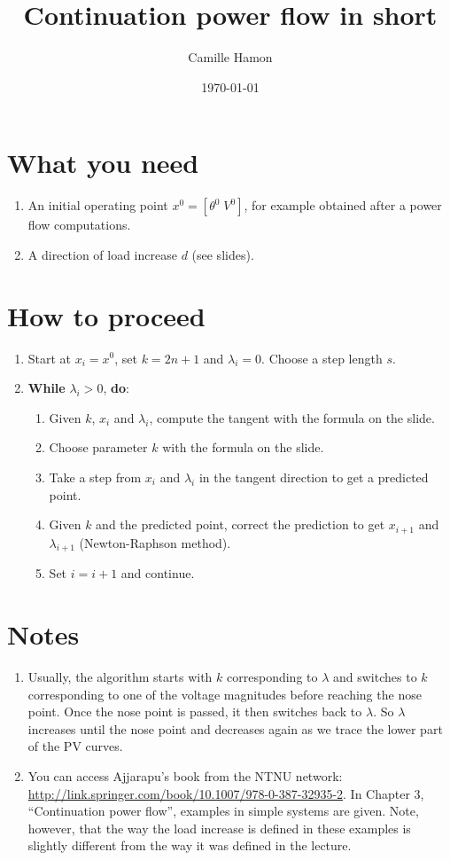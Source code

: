 \documentclass[11pt]{article}
\title{Continuation power flow in short}
\date{\today}
\author{Camille Hamon}
\begin{document}
\maketitle

\section*{What you need}
\begin{enumerate}
\item An initial operating point $x^0=[\theta^0 \; V^0]$, for example obtained after a power flow computations.
\item A direction of load increase $d$ (see slides).
\end{enumerate}

\section*{How to proceed}
\begin{enumerate}
\item Start at $x_i=x^0$, set $k=2n+1$ and $\lambda_i=0$. Choose a step length $s$.
\item \textbf{While} $\lambda_i >0$, \textbf{do}:
  \begin{enumerate}
  \item Given $k$, $x_i$ and $\lambda_i$, compute the tangent with the formula on the slide.
  \item Choose parameter $k$ with the formula on the slide.
  \item Take a step from $x_i$ and $\lambda_i$ in the tangent direction to get a predicted point.
  \item Given $k$ and the predicted point, correct the prediction to get $x_{i+1}$ and $\lambda_{i+1}$ (Newton-Raphson method).
  \item Set $i=i+1$ and continue.
  \end{enumerate}
\end{enumerate}

\section*{Notes}

\begin{enumerate}
\item Usually, the algorithm starts with $k$ corresponding to $\lambda$ and switches to $k$ corresponding to one of the voltage magnitudes before reaching the nose point. Once the nose point is passed, it then switches back to $\lambda$. So $\lambda$ increases until the nose point and decreases again as we trace the lower part of the PV curves.
\item You can access Ajjarapu's book from the NTNU network: \url{http://link.springer.com/book/10.1007/978-0-387-32935-2}. In Chapter 3, ``Continuation power flow'', examples in simple systems are given. Note, however, that the way the load increase is defined in these examples is slightly different from the way it was defined in the lecture.
\end{enumerate}
\end{document}
